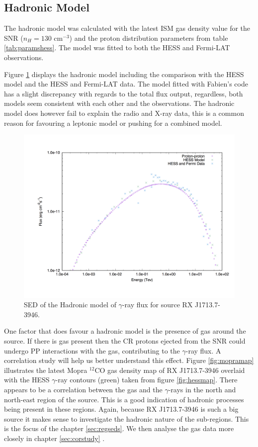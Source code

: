 \documentclass[12pt,a4paper]{article}
\begin{document}
\subsection{Hadronic Model}
The hadronic model was calculated with the latest ISM gas density value for the SNR ($n_H = 130$ cm$^{-3}$) and the proton distribution parameters from table \ref{tab:paramshess}. The model was fitted to both the HESS and Fermi-LAT observations. 

Figure \ref{fig:rxj1713had} displays the hadronic model including the comparison with the HESS model and the HESS and Fermi-LAT data. The model fitted with Fabien's code has a slight discrepancy with regards to the total flux output, regardless, both models seem consistent with each other and the observations. The hadronic model does however fail to explain the radio and X-ray data, this is a common reason for favouring a leptonic model or pushing for a combined model. 
\begin{figure}[H]
	\centering
	\includegraphics[width=0.45\linewidth, height=0.35\textheight, angle=-90]{rxj1713_had}
	\caption{SED of the Hadronic model of $\gamma$-ray flux for source RX J1713.7-3946.}
	\label{fig:rxj1713had}
\end{figure}
One factor that does favour a hadronic model is the presence of gas around the source. If there is gas present then the CR protons ejected from the SNR could undergo PP interactions with the gas, contributing to the $\gamma$-ray flux. A correlation study will help us better understand this effect. Figure \ref{fig:mopramap} illustrates the latest Mopra $^{12}$CO gas density map of RX J1713.7-3946 overlaid with the HESS $\gamma$-ray contours (green) taken from figure \ref{fig:hessmap}. There appears to be a correlation between the gas and the $\gamma$-rays in the north and north-east region of the source. This is a good indication of hadronic processes being present in these regions. Again, because RX J1713.7-3946 is such a big source it makes sense to investigate the hadronic nature of the sub-regions. This is the focus of the chapter \ref{sec:regseds}. We then analyse the gas data more closely in chapter \ref{sec:corstudy} .
\end{document}
